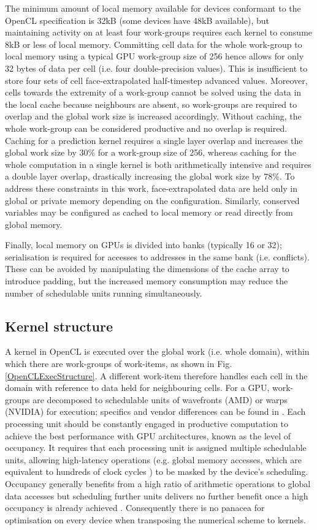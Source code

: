 \documentclass[11pt,english,a4paper]{article}
\begin{document}
The minimum amount of local memory available for devices conformant to the OpenCL specification is 32kB (some devices have 48kB available), but maintaining activity on at least four work-groups requires each kernel to consume 8kB or less of local memory. Committing cell data for the whole work-group to local memory using a typical GPU work-group size of 256 hence allows for only 32 bytes of data per cell (i.e. four double-precision values).  This is insufficient to store four sets of cell face-extrapolated half-timestep advanced values. Moreover, cells towards the extremity of a work-group cannot be solved using the data in the local cache because neighbours are absent, so work-groups are required to overlap and the global work size is increased accordingly. Without caching, the whole work-group can be considered productive and no overlap is required. Caching for a prediction kernel requires a single layer overlap and increases the global work size by 30\% for a work-group size of 256, whereas caching for the whole computation in a single kernel is both arithmetically intensive and requires a double layer overlap, drastically increasing the global work size by 78\%. To address these constraints in this work, face-extrapolated data are held only in global or private memory depending on the configuration. Similarly, conserved variables may be configured as cached to local memory or read directly from global memory.

Finally, local memory on GPUs is divided into banks (typically 16 or 32); serialisation is required for accesses to addresses in the same bank (i.e. conflicts). These can be avoided by manipulating the dimensions of the cache array to introduce padding, but the increased memory consumption may reduce the number of schedulable units running simultaneously.

\subsection{Kernel structure}

A kernel in OpenCL is executed over the global work (i.e. whole domain), within which there are work-groups of work-items, as shown in Fig. \ref{OpenCLExecStructure}. A different work-item therefore handles each cell in the domain with reference to data held for neighbouring cells. For a GPU, work-groups are decomposed to schedulable units of wavefronts (AMD) or warps (NVIDIA) for execution; specifics and vendor differences can be found in \cite{AMD_11,NVIDIA_10,NVIDIA_10a,KhronosOpenCL_12}. Each processing unit should be constantly engaged in productive computation to achieve the best performance with GPU architectures, known as the level of occupancy. It requires that each processing unit is assigned multiple schedulable units, allowing high-latency operations (e.g. global memory accesses, which are equivalent to hundreds of clock cycles \cite{NVIDIA_10}) to be masked by the device's scheduling. Occupancy generally benefits from a high ratio of arithmetic operations to global data accesses but scheduling further units delivers no further benefit once a high occupancy is already achieved \cite{AMD_11}. Consequently there is no panacea for optimisation on every device when transposing the numerical scheme to kernels.
\end{document}
